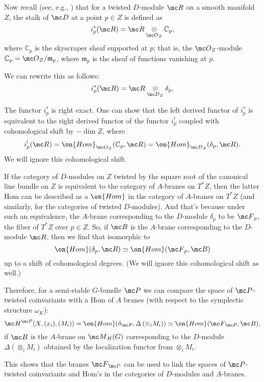 \documentclass[11pt,reqno]{amsart}
\theoremstyle{plain}
\numberwithin{equation}{section}
\newcommand{\C}{\mathbb{C}}
\theoremstyle{definition}
\begin{document}
Now recall (see, e.g., \cite{KS,GM}) that for a twisted $D$-module
${\mc R}$ on a smooth manifold $Z$, the stalk of ${\mc D}$ at a point
$p \in Z$ is defined as
$$
i_p^*({\mc R}) = {\mc R} \underset{{\mc O}_Z}\otimes \C_p,
$$
where $\C_p$ is the skyscraper sheaf supported at $p$; that is, the
${\mc O}_Z$-module $\C_p = {\mc O}_Z/{\mathfrak m}_p$, where
${\mathfrak m}_p$ is the sheaf of functions vanishing at $p$.

We can rewrite this as follows:
$$
i_p^*({\mc R}) = {\mc R} \underset{{\mc D}_Z}\otimes \delta_p,
$$

The functor $i^*_p$ is right exact. One can show that the left derived
functor of $i_p^*$ is equivalent to the right derived functor of the
functor $i^!_p$ coupled with cohomological shift by $-\dim Z$, where
$$
i^!_p({\mc R}) = \on{Hom}_{{\mc O}_Z}(\C_p,{\mc R}) = \on{Hom}_{{\mc
    D}_Z}(\delta_p,{\mc R}).
$$
We will ignore this cohomological shift.

If the category of $D$-modules on $Z$ twisted by the square root of the
canonical line bundle on $Z$ is equivalent to the category of
$A$-branes on $T^*Z$, then the latter Hom can be described as a
$\on{Hom}$ in the category of $A$-branes on $T^*Z$ (and similarly, for
the categories of twisted $D$-modules). And that's because under such
an equivalence, the $A$-brane corresponding to the $D$-module
$\delta_p$ to be ${\mc F}_p$, the fiber of $T^*Z$ over $p \in Z$. So,
if ${\mc B}$ is the $A$-brane corresponding to the $D$-module ${\mc
  R}$, then we find that
isomorphic to
\begin{equation}    \label{isom}
\on{Hom}(\delta_p,{\mc R}) \simeq \on{Hom}({\mc F}_p,{\mc B})
\end{equation}
up to a shift of cohomological degrees. (We will ignore this
cohomological shift as well.)

Therefore, for a semi-stable $G$-bundle ${\mc P}$ we can compare the
space of ${\mc P}$-twisted coinvariants with a Hom of $A$ branes (with
respect to the symplectic structure $\omega_K$):
$$
{\mc H}^{\mc P}(X,(x_i),(M_i)) = \on{Hom}(\delta_{\mc P},\Delta\left(
  \otimes_i M_i \right)) \simeq \on{Hom}({\mc F}_{\mc P},{\mc B}),
$$
if ${\mc B}$ is the $A$-brane on ${\mc M}_H(G)$ corresponding to
the $D$-module $\Delta\left( \otimes_i M_i \right)$ obtained by
the localization functor from $\otimes_i M_i$.

This shows that the branes ${\mc F}_{\mc P}$ can be used to
link the spaces of ${\mc P}$-twisted coinvariants and Hom's in the
categories of $D$-modules and $A$-branes.
\end{document}
